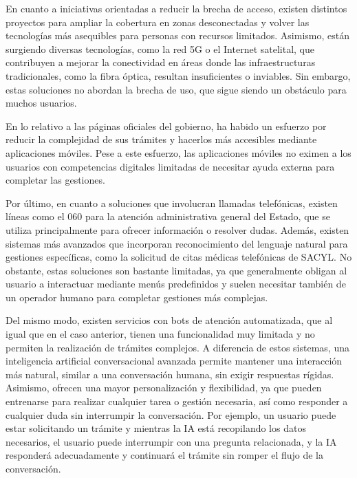     En cuanto a iniciativas orientadas a reducir la brecha de acceso, existen distintos proyectos para ampliar la cobertura en zonas desconectadas y volver las tecnologías más asequibles para personas con recursos limitados. 
    Asimismo, están surgiendo diversas tecnologías, como la red 5G o el Internet satelital, que contribuyen a mejorar la conectividad en áreas donde las infraestructuras tradicionales, como la fibra óptica, resultan insuficientes o inviables.
    Sin embargo, estas soluciones no abordan la brecha de uso, que sigue siendo un obstáculo para muchos usuarios.

    En lo relativo a las páginas oficiales del gobierno, ha habido un esfuerzo por reducir la complejidad de sus trámites y hacerlos más accesibles mediante aplicaciones móviles.
    Pese a este esfuerzo, las aplicaciones móviles no eximen a los usuarios con competencias digitales limitadas de necesitar ayuda externa para completar las gestiones.

    Por último, en cuanto a soluciones que involucran llamadas telefónicas, existen líneas como el 060 para la atención administrativa general del Estado, que se utiliza principalmente para ofrecer información o resolver dudas.
    Además, existen sistemas más avanzados que incorporan reconocimiento del lenguaje natural para gestiones específicas, como la solicitud de citas médicas telefónicas de SACYL. 
    No obstante, estas soluciones son bastante limitadas, ya que generalmente obligan al usuario a interactuar mediante menús predefinidos y suelen necesitar también de un operador humano para completar gestiones más complejas.
    
    Del mismo modo, existen servicios con bots de atención automatizada, que al igual que en el caso anterior, tienen una funcionalidad muy limitada y no permiten la realización de trámites complejos.
    A diferencia de estos sistemas, una inteligencia artificial conversacional avanzada permite mantener una interacción más natural, similar a una conversación humana, sin exigir respuestas rígidas.
    Asimismo, ofrecen una mayor personalización y flexibilidad, ya que pueden entrenarse para realizar cualquier tarea o gestión necesaria, así como responder a cualquier duda sin interrumpir la conversación. 
    Por ejemplo, un usuario puede estar solicitando un trámite y mientras la IA está recopilando los datos necesarios, el usuario puede interrumpir con una pregunta relacionada, y la IA responderá adecuadamente y continuará el trámite sin romper el flujo de la conversación.


